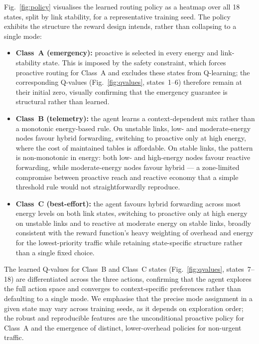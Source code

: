 \documentclass[12pt]{article}
\begin{document}
Fig.~\ref{fig:policy} visualises the learned routing policy as a
heatmap over all 18 states, split by link stability, for a
representative training seed. The policy exhibits the structure the
reward design intends, rather than collapsing to a single mode:

\begin{itemize}
\item \textbf{Class~A (emergency):} proactive is selected in every
energy and link-stability state. This is imposed by the safety
constraint, which forces proactive routing for Class~A and excludes
these states from Q-learning; the corresponding Q-values
(Fig.~\ref{fig:qvalues}, states~1--6) therefore remain at their
initial zero, visually confirming that the emergency guarantee is
structural rather than learned.

\item \textbf{Class~B (telemetry):} the agent learns a
context-dependent mix rather than a monotonic energy-based rule. On
unstable links, low- and moderate-energy nodes favour hybrid
forwarding, switching to proactive only at high energy, where the
cost of maintained tables is affordable. On stable links, the
pattern is non-monotonic in energy: both low- and high-energy nodes
favour reactive forwarding, while moderate-energy nodes favour
hybrid --- a zone-limited compromise between proactive reach and
reactive economy that a simple threshold rule would not
straightforwardly reproduce.

\item \textbf{Class~C (best-effort):} the agent favours hybrid
forwarding across most energy levels on both link states, switching
to proactive only at high energy on unstable links and to reactive
at moderate energy on stable links, broadly consistent with the
reward function's heavy weighting of overhead and energy for the
lowest-priority traffic while retaining state-specific structure
rather than a single fixed choice.
\end{itemize}

The learned Q-values for Class~B and Class~C states
(Fig.~\ref{fig:qvalues}, states~7--18) are differentiated across the
three actions, confirming that the agent explores the full action
space and converges to context-specific preferences rather than
defaulting to a single mode. We emphasise that the precise
mode assignment in a given state may vary across training seeds, as
it depends on exploration order; the robust and reproducible features
are the unconditional proactive policy for Class~A and the
emergence of distinct, lower-overhead policies for non-urgent
traffic.
\end{document}

